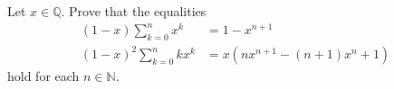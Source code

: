 \documentclass[paper=a4, fontsize=12pt]{scrartcl} %
\newcommand{\QQ}{\mathbb{Q}} %
\newcommand{\NN}{\mathbb{N}} %
\newcommand{\tup}[1]{\left( #1 \right)}
\let\sumnonlimits\sum
\renewcommand{\sum}{\sumnonlimits\limits}
\theoremstyle{plainsl}
\theoremstyle{definition}
\theoremstyle{remark}
\begin{document}
Let $x \in \QQ$.
Prove that the equalities
\begin{align}
\tup{1-x} \sum_{k=0}^n x^k &= 1 - x^{n+1}
\label{eq.exe.geo-series.1}
\\
\tup{1-x}^2 \sum_{k=0}^n k x^k
&= x \tup{ n x^{n+1} - \tup{n+1} x^n + 1 }
\label{eq.exe.geo-series.2}
\end{align}
hold for each $n \in \NN$.
\end{document}
